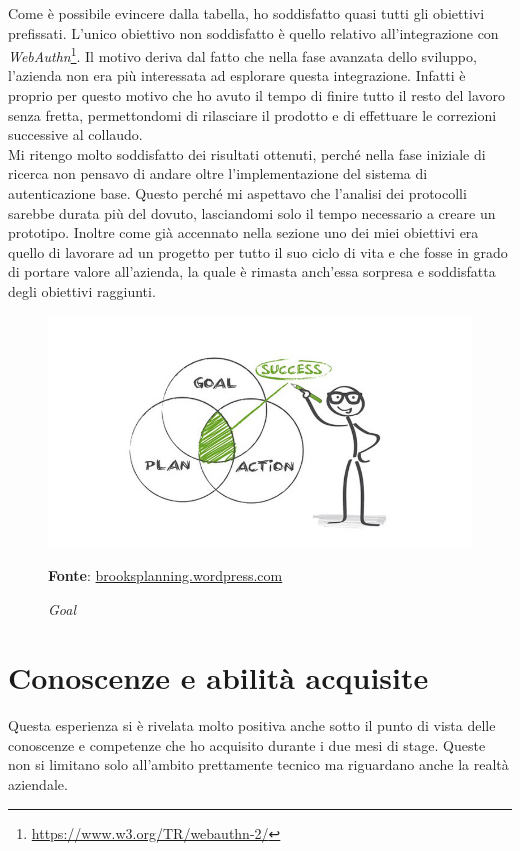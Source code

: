 Come è possibile evincere dalla tabella, ho soddisfatto quasi tutti gli obiettivi prefissati. L'unico obiettivo non soddisfatto è quello relativo all'integrazione con \textit{WebAuthn}\footnote{\url{https://www.w3.org/TR/webauthn-2/}}. Il motivo deriva dal fatto che nella fase avanzata dello sviluppo, l'azienda non era più interessata ad esplorare questa integrazione. Infatti è proprio per questo motivo che ho avuto il tempo di finire tutto il resto del lavoro senza fretta, permettondomi di rilasciare il prodotto e di effettuare le correzioni successive al collaudo. \\
Mi ritengo molto soddisfatto dei risultati ottenuti, perché nella fase iniziale di ricerca non pensavo di andare oltre l'implementazione del sistema di autenticazione base. Questo perché mi aspettavo che l'analisi dei protocolli sarebbe durata più del dovuto, lasciandomi solo il tempo necessario a creare un prototipo. 
Inoltre come già accennato nella sezione  uno dei miei obiettivi era quello di lavorare ad un progetto per tutto il suo ciclo di vita e che fosse in grado di portare valore all'azienda, la quale è rimasta anch'essa sorpresa e soddisfatta degli obiettivi raggiunti.

    \begin{figure}[ht]
        \centering
        \includegraphics[width=1\textwidth]{immagini/success.jpg}
        \caption{\textit{Goal}}
        \textbf{Fonte}:
        \href{https://brooksplanning.wordpress.com/2016/06/12/action-plan-for-success/
}{brooksplanning.wordpress.com}
        \label{fig: Goal}
    \end{figure}

\newpage

\section{Conoscenze e abilità acquisite}
Questa esperienza si è rivelata molto positiva anche sotto il punto di vista delle conoscenze e competenze che ho acquisito durante i due mesi di stage.
Queste non si limitano solo all'ambito prettamente tecnico ma riguardano anche la realtà aziendale. 
